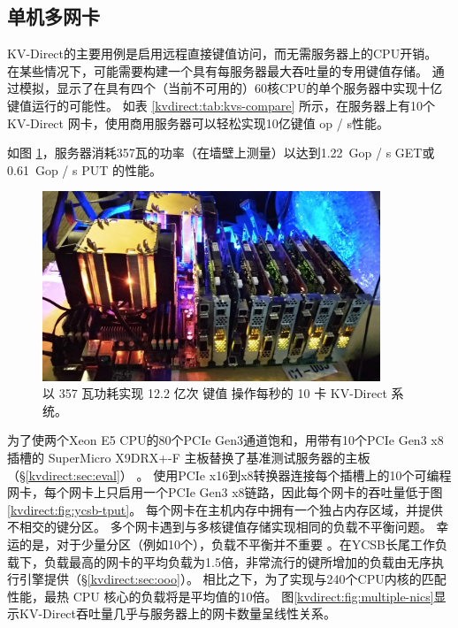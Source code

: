 \subsection{单机多网卡}
\label{kvdirect:sec:multi-nic}

KV-Direct的主要用例是启用远程直接键值访问，而无需服务器上的CPU开销。
在某些情况下，可能需要构建一个具有每服务器最大吞吐量的专用键值存储。
通过模拟，\cite {li2016full}显示了在具有四个（当前不可用的）60核CPU的单个服务器中实现十亿键值运行的可能性。
如表 \ref{kvdirect:tab:kvs-compare} 所示，在服务器上有10个KV-Direct 网卡，使用商用服务器可以轻松实现10亿键值 op / s性能。

如图 \ref{kvdirect:fig:photo}，服务器消耗357瓦的功率（在墙壁上测量）以达到1.22~Gop / s GET或0.61~Gop / s PUT 的性能。


\begin{figure}[htbp]
	\centering
	\includegraphics[width=0.9\textwidth]{figure/kvdirect_photo.jpg}
	\caption{以 357 瓦功耗实现 12.2 亿次 键值 操作每秒的 10 卡 KV-Direct 系统。}
	\label{kvdirect:fig:photo}
\end{figure}

为了使两个Xeon E5 CPU的80个PCIe Gen3通道饱和，用带有10个PCIe Gen3 x8插槽的 SuperMicro X9DRX+-F 主板替换了基准测试服务器的主板（\S\ref {kvdirect:sec:eval}） 。
使用PCIe x16到x8转换器连接每个插槽上的10个可编程网卡，每个网卡上只启用一个PCIe Gen3 x8链路，因此每个网卡的吞吐量低于图 \ref {kvdirect:fig:ycsb-tput}。
每个网卡在主机内存中拥有一个独占内存区域，并提供不相交的键分区。
多个网卡遇到与多核键值存储实现相同的负载不平衡问题。
幸运的是，对于少量分区（例如10个），负载不平衡并不重要 \cite {lim2014mica,li2016full}。在YCSB长尾工作负载下，负载最高的网卡的平均负载为1.5倍，非常流行的键所增加的负载由无序执行引擎提供（\S \ref {kvdirect:sec:ooo}）。
相比之下，为了实现与240个CPU内核的匹配性能，最热 CPU 核心的负载将是平均值的10倍。
图\ref {kvdirect:fig:multiple-nics}显示KV-Direct吞吐量几乎与服务器上的网卡数量呈线性关系。


